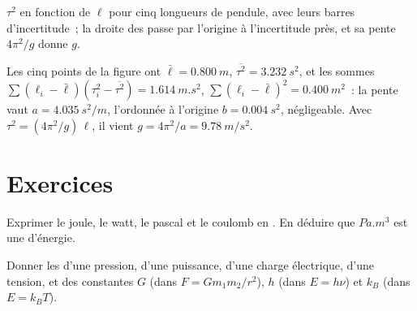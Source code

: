 \begin{omfigure}

{\small $\tau^2$ en fonction de $\ell$ pour cinq longueurs de pendule,
avec leurs barres d'incertitude~; la droite des  passe
par l'origine à l'incertitude près, et sa pente $4\pi^2/g$ donne $g$.}
\end{omfigure}

\begin{example}\label{ex:b1:units-dimensions:slope}
Les cinq points de la figure ont $\bar\ell = \qty{0.800}{m}$,
$\overline{\tau^2} = \qty{3.232}{s^2}$, et les sommes
$\sum (\ell_i - \bar\ell)(\tau_i^2 - \overline{\tau^2}) = \qty{1.614}{m.s^2}$,
$\sum (\ell_i - \bar\ell)^2 = \qty{0.400}{m^2}$~: la pente vaut
$a = \qty{4.035}{s^2/m}$, l'ordonnée à l'origine $b = \qty{0.004}{s^2}$,
négligeable. Avec $\tau^2 = (4\pi^2/g)\,\ell$, il vient
$g = 4\pi^2/a = \qty{9.78}{m/s^2}$.
\end{example}

\section{Exercices}

\begin{exercise}[$\star$]\label{exo:b1:units-dimensions:1}
Exprimer le joule, le watt, le pascal et le coulomb en .
En déduire que $\unit{Pa.m^3}$ est une  d'énergie.
\end{exercise}

\begin{exercise}[$\star$]\label{exo:b1:units-dimensions:2}
Donner les  d'une pression, d'une puissance, d'une charge
électrique, d'une tension, et des constantes $G$ (dans
$F = Gm_1m_2/r^2$), $h$ (dans $E = h\nu$) et $k_B$ (dans $E = k_B T$).
\end{exercise}

